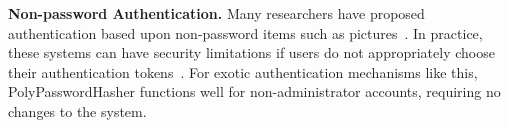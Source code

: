 {\bf Non-password Authentication.}
Many researchers have proposed authentication based upon non-password items
such as pictures~\cite{dhamija2000deja}.   In practice, these
systems can have security limitations if users do not appropriately choose
their authentication tokens~\cite{davis2004user}.   For exotic 
authentication mechanisms like this, PolyPasswordHasher functions well for 
non-administrator accounts, requiring no changes to the system.






